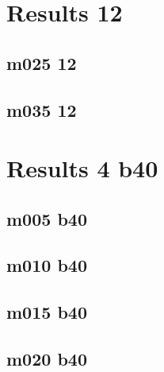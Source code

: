 \documentclass[pdftex,letterpaper,10pt]{article}
\begin{document}


\clearpage \section{Results 12}

\subsection{m025 12}



\clearpage \subsection{m035 12}



\clearpage \section{Results 4 b40}

\subsection{m005 b40}



\clearpage \subsection{m010 b40}



\clearpage \subsection{m015 b40}



\clearpage \subsection{m020 b40}
\end{document}
